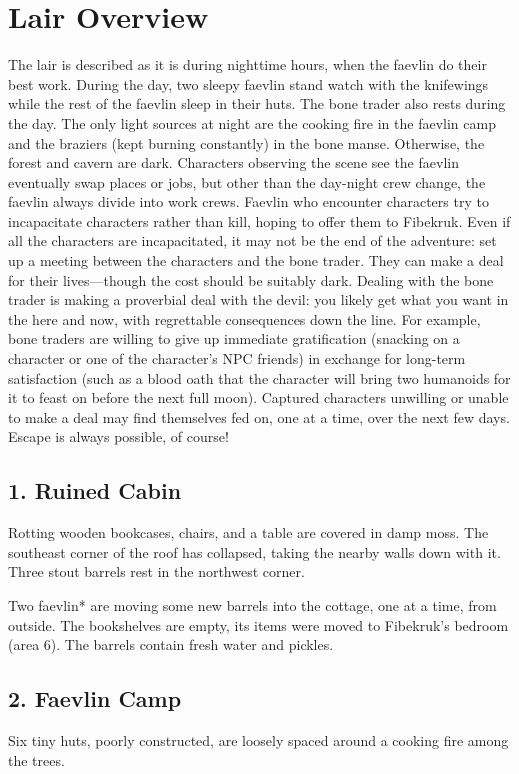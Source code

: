 \documentclass[10pt,a4paper,twoside,twocolumn,openany,bg=print,nodeprecatedcode]{dndbook}
\begin{document}
\section{Lair Overview}
The lair is described as it is during nighttime hours, when the faevlin do their best work. During the day, two sleepy faevlin stand watch with the knifewings while the rest of the faevlin sleep in their huts. The bone trader also rests during the day. The only light sources at night are the cooking fire in the faevlin camp and the braziers (kept burning constantly) in the bone manse. Otherwise, the forest and cavern are dark. Characters observing the scene see the faevlin eventually swap places or jobs, but other than the day-night crew change, the faevlin always divide into work crews.
Faevlin who encounter characters try to incapacitate characters rather than kill, hoping to offer them to Fibekruk. Even if all the characters are incapacitated, it may not be the end of the adventure: set up a meeting between the characters and the bone trader. They can make a deal for their lives—though the cost should be suitably dark.
Dealing with the bone trader is making a proverbial deal with the devil: you likely get what you want in the here and now, with regrettable consequences down the line. For example, bone traders are willing to give up immediate gratification (snacking on a character or one of the character's NPC friends) in exchange for long-term satisfaction (such as a blood oath that the character will bring two humanoids for it to feast on before the next full moon). Captured characters unwilling or unable to make a deal may find themselves fed on, one at a time, over the next few days. Escape is always possible, of course!
\subsection{1. Ruined Cabin}
\begin{DndReadAloud}{}
Rotting wooden bookcases, chairs, and a table are covered in damp moss. The southeast corner of the roof has collapsed, taking the nearby walls down with it. Three stout barrels rest in the northwest corner.
\end{DndReadAloud}

Two faevlin* are moving some new barrels into the cottage, one at a time, from outside. The bookshelves are empty, its items were moved to Fibekruk's bedroom (area 6). The barrels contain fresh water and pickles.
\subsection{2. Faevlin Camp}
\begin{DndReadAloud}{}
Six tiny huts, poorly constructed, are loosely spaced around a cooking fire among the trees.
\end{DndReadAloud}
\end{document}
